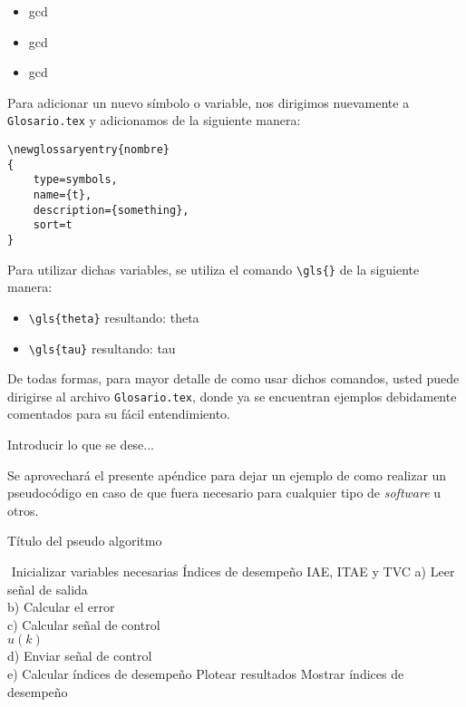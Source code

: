\begin{itemize}
    \item \acrlong{gcd}
    \item \acrshort{gcd}
    \item \acrfull{gcd}
\end{itemize}

Para adicionar un nuevo símbolo o variable, nos dirigimos nuevamente a \verb|Glosario.tex| y adicionamos de la siguiente manera:

\begin{verbatim}
\newglossaryentry{nombre}
{
    type=symbols,
    name={t},
    description={something},
    sort=t
}
\end{verbatim}

Para utilizar dichas variables, se utiliza el comando \verb|\gls{}| de la siguiente manera:
 
\begin{itemize}
    \item \verb|\gls{theta}| resultando: \gls{theta} 
    \item \verb|\gls{tau}| resultando: \gls{tau}
\end{itemize}

De todas formas, para mayor detalle de como usar dichos comandos, usted puede dirigirse al archivo \verb|Glosario.tex|, donde ya se encuentran ejemplos debidamente comentados para su fácil entendimiento.

Introducir lo que se dese...

Se aprovechará el presente apéndice para dejar un ejemplo de como realizar un pseudocódigo en caso de que fuera necesario para cualquier tipo de \textit{software} u otros. 

\begin{algorithm}[ht!]
	\caption{Título del pseudo algoritmo}
	\label{Pseudo_alg} %
	\begin{algorithmic}[1] 
		\REQUIRE $ $
			\STATE Inicializar variables necesarias
			\STATE Índices de desempeño IAE, ITAE y TVC
			\STATE {}
			{
			    \hspace{0.5cm} a) Leer señal de salida \\
				\hspace{0.5cm} b) Calcular el error \\
				\hspace{0.5cm} c) Calcular señal de control \\
				\hspace{0.9cm} $u(k)$ \\
				\hspace{0.5cm} d) Enviar señal de control \\
				\hspace{0.5cm} e) Calcular índices de desempeño
			}
			\STATE Plotear resultados
			\STATE Mostrar índices de desempeño
			\ENSURE $ $
	\end{algorithmic}
\end{algorithm}

